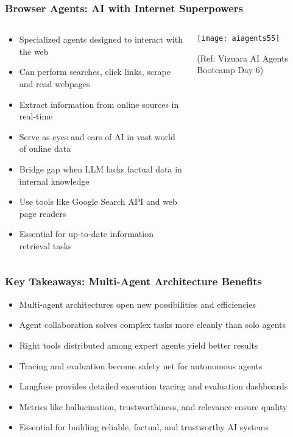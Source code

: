 \begin{frame}[fragile]\frametitle{Browser Agents: AI with Internet Superpowers}
\begin{columns}
    \begin{column}[T]{0.6\linewidth}
      \begin{itemize}
		\item Specialized agents designed to interact with the web
		\item Can perform searches, click links, scrape and read webpages
		\item Extract information from online sources in real-time
		\item Serve as eyes and ears of AI in vast world of online data
		\item Bridge gap when LLM lacks factual data in internal knowledge
		\item Use tools like Google Search API and web page readers
		\item Essential for up-to-date information retrieval tasks
	  \end{itemize}
    \end{column}
    \begin{column}[T]{0.4\linewidth}
		\begin{center}
		\texttt{[image: aiagents55]}
		
		{\tiny (Ref: Vizuara AI Agents Bootcamp Day 6)}
		\end{center}	
    \end{column}
  \end{columns}
\end{frame}

\begin{frame}[fragile]\frametitle{Key Takeaways: Multi-Agent Architecture Benefits}

      \begin{itemize}
		\item Multi-agent architectures open new possibilities and efficiencies
		\item Agent collaboration solves complex tasks more cleanly than solo agents
		\item Right tools distributed among expert agents yield better results
		\item Tracing and evaluation become safety net for autonomous agents
		\item Langfuse provides detailed execution tracing and evaluation dashboards
		\item Metrics like hallucination, trustworthiness, and relevance ensure quality
		\item Essential for building reliable, factual, and trustworthy AI systems
	  \end{itemize}

\end{frame}